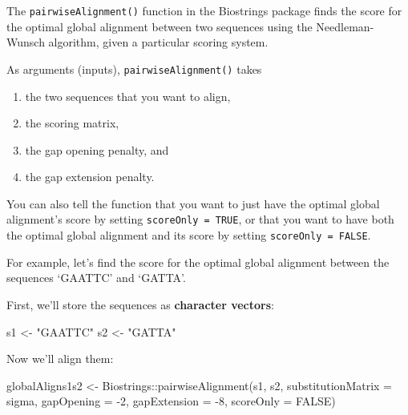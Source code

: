 \documentclass[
]{book}
\newenvironment{Shaded}{\begin{snugshade}}{\end{snugshade}}
\newcommand{\AttributeTok}[1]{\textcolor[rgb]{0.77,0.63,0.00}{#1}}
\newcommand{\ConstantTok}[1]{\textcolor[rgb]{0.00,0.00,0.00}{#1}}
\newcommand{\DecValTok}[1]{\textcolor[rgb]{0.00,0.00,0.81}{#1}}
\newcommand{\FunctionTok}[1]{\textcolor[rgb]{0.00,0.00,0.00}{#1}}
\newcommand{\NormalTok}[1]{#1}
\newcommand{\OtherTok}[1]{\textcolor[rgb]{0.56,0.35,0.01}{#1}}
\newcommand{\SpecialCharTok}[1]{\textcolor[rgb]{0.00,0.00,0.00}{#1}}
\newcommand{\StringTok}[1]{\textcolor[rgb]{0.31,0.60,0.02}{#1}}
\providecommand{\tightlist}{%
  \setlength{\itemsep}{0pt}\setlength{\parskip}{0pt}}
\begin{document}
The \texttt{pairwiseAlignment()} function in the Biostrings package finds the score for the optimal global alignment between two sequences using the Needleman-Wunsch algorithm, given a particular scoring system.

As arguments (inputs), \texttt{pairwiseAlignment()} takes

\begin{enumerate}
\def\labelenumi{\arabic{enumi}.}
\tightlist
\item
  the two sequences that you want to align,
\item
  the scoring matrix,
\item
  the gap opening penalty, and
\item
  the gap extension penalty.
\end{enumerate}

You can also tell the function that you want to just have the optimal global alignment's score by setting \texttt{scoreOnly\ =\ TRUE}, or that you want to have both the optimal global alignment and its score by setting \texttt{scoreOnly\ =\ FALSE}.

For example, let's find the score for the optimal global alignment between the sequences `GAATTC' and `GATTA'.

First, we'll store the sequences as \textbf{character vectors}:

\begin{Shaded}
\begin{Highlighting}[]
\NormalTok{s1 }\OtherTok{\textless{}{-}} \StringTok{"GAATTC"}
\NormalTok{s2 }\OtherTok{\textless{}{-}} \StringTok{"GATTA"}
\end{Highlighting}
\end{Shaded}

Now we'll align them:

\begin{Shaded}
\begin{Highlighting}[]
\NormalTok{globalAligns1s2 }\OtherTok{\textless{}{-}}\NormalTok{ Biostrings}\SpecialCharTok{::}\FunctionTok{pairwiseAlignment}\NormalTok{(s1, s2, }
                                                 \AttributeTok{substitutionMatrix =}\NormalTok{ sigma, }
                                                 \AttributeTok{gapOpening =} \SpecialCharTok{{-}}\DecValTok{2}\NormalTok{,}
                                                 \AttributeTok{gapExtension =} \SpecialCharTok{{-}}\DecValTok{8}\NormalTok{, }
                                                 \AttributeTok{scoreOnly =} \ConstantTok{FALSE}\NormalTok{)}
\end{Highlighting}
\end{Shaded}
\end{document}

